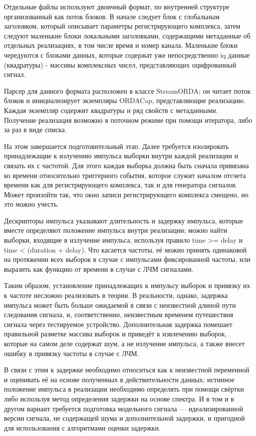 \documentclass{report}
\begin{document}
Отдельные файлы используют двоичный формат, по внутренней структуре организованный как поток блоков. В начале следует блок с глобальным заголовком, который описывает параметры регистрирующего комплекса, затем следуют маленькие блоки локальными заголовками, содержащими метаданные об отдельных реализациях, в том числе время и номер канала. Маленькие блоки чередуются с блоками данных, которые содержат уже непосредственно iq данные (квадратуры) - массивы комплексных чисел, представляющих оцифрованный сигнал.

Парсер для данного формата расположен в классе StreamORDA; он читает поток блоков и инициализирует экземпляры ORDACap, представляющие реализацию. Каждая экземпляр содержит квадратуры и ряд свойств с метаданными. Получение реализация возможно в поточном режиме при помощи итератора, либо за раз в виде списка.

На этом завершается подготовительный этап. Далее требуется изолировать принадлежащие к излучению импульса выборки внутри каждой реализации и связать их с частотой. Для этого каждая выборка должна быть сначала привязана ко времени относительно триггерного события, которое служит началом отсчета времени как для регистрирующего комплекса, так и для генератора сигналов. Может произойти так, что окно записи регистрирующего комплекса смещено, но это можно учесть.

Дескрипторы импульса указывают длительность и задержку импульса, которые вместе определяют положение импульса внутри реализации; можно найти выборки, входящие в излучение импульса, используя правило time >= delay и time < (duration + delay). Что касается частоты, её можно принять одинаковой на протяжении всех выборок в случае с импульсами фиксированной частоты, или выразить как функцию от времени в случае с ЛЧМ сигналами.

Таким образом, установление принадлежащих к импульсу выборок и привязку их к частоте несложно реализовать в теории. В реальности, однако, задержка импульса может быть больше ожидаемой в связи с неизвестной длиной пути следования сигнала, и, соответственно, неизвестным временем путешествия сигнала через тестируемое устройство. Дополнительная задержка помешает правильной разметке массива выборок и приведёт к извлечению выборок, которые на самом деле содержат шум, а не излучение импульса, а также внесет ошибку в привязку частоты в случае с ЛЧМ.

В связи с этим к задержке необходимо относиться как к неизвестной переменной и оценивать её на основе полученных в действительности данных; истинное положение импульса в реализации необходимо определять при помощи свёртки либо используя метод определения задержки на основе спектра. И в том и в другом вариант требуется подготовка модельного сигнала --- идеализированной версии сигнала, не содержащей шума и дополнительной задержки, и пригодной для использования с алгоритмами оценки задержки.
\end{document}
